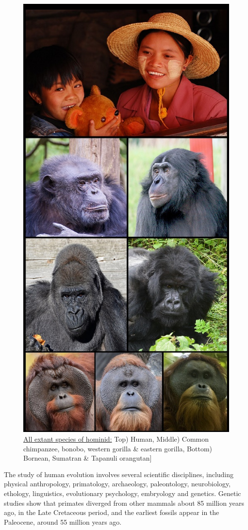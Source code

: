 \begin{figure}

{\centering \includegraphics[width=0.7\linewidth]{./figures/animals/Hominidae_(extant_species)} 

}

\caption{\href{https://commons.wikimedia.org/wiki/File:Hominidae_(extant_species).jpg}{All extant species of hominid:} Top) Human, Middle) Common chimpanzee, bonobo, western gorilla \& eastern gorilla, Bottom) Bornean, Sumatran \& Tapanuli orangutan{]}}\label{fig:extanthomonidae}
\end{figure}

The study of human evolution involves several scientific disciplines, including physical anthropology, primatology, archaeology, paleontology, neurobiology, ethology, linguistics, evolutionary psychology, embryology and genetics. Genetic studies show that primates diverged from other mammals about 85 million years ago, in the Late Cretaceous period, and the earliest fossils appear in the Paleocene, around 55 million years ago.

